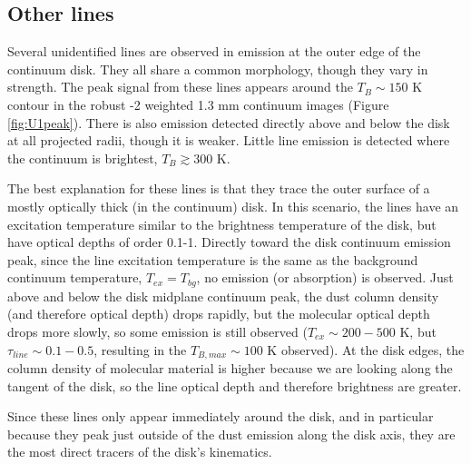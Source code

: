 \documentclass[twocolumn]{aastex61}
\newcommand{\water}{H$_{2}$O\xspace}		%
\begin{document}

\subsection{Other lines}
\label{sec:otherlines}
Several unidentified lines are observed in  emission at the outer edge of the
continuum disk.  They all share a common morphology, though they vary in
strength.
The peak signal from these lines appears around the $T_B\sim150$ K  contour
in the robust -2 weighted 1.3 mm continuum images
(Figure \ref{fig:U1peak}).
There is also emission detected directly above and below the disk at all projected
radii, though it is weaker.  Little line emission is detected where the continuum is
brightest, $T_B\gtrsim300$ K.

The best explanation for these lines is that they trace the outer surface of a
mostly optically thick (in the continuum) disk.  In this scenario,
the lines have an excitation temperature similar to the brightness temperature
of the disk, but have optical depths of order 0.1-1.  
Directly toward the disk
continuum emission peak, since
the line excitation temperature is the same as the background continuum temperature,
$T_{ex}=T_{bg}$, no emission (or absorption) is observed.  Just above and below
the disk midplane continuum peak, the dust column density (and therefore
optical depth) drops rapidly, but the molecular optical depth drops more
slowly, so some emission is still
observed ($T_{ex}\sim200-500$ K, but $\tau_{line}\sim0.1-0.5$, resulting in 
the $T_{B,max} \sim 100$ K observed).  At the disk edges, the column density of
molecular material is higher because we are looking along the tangent of the
disk, so the line optical depth and therefore brightness are greater.

Since these lines only appear immediately around the disk, and in particular
because they peak just outside of the dust emission along the disk axis, they
are the most direct tracers of the disk's kinematics.

\end{document}
